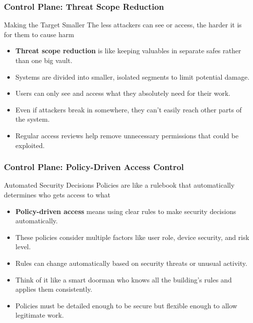 \documentclass{beamer}
\begin{document}
\begin{frame}
    \frametitle{Control Plane: Threat Scope Reduction}
    \begin{block}{Making the Target Smaller}
        The less attackers can see or access, the harder it is for them to cause harm
    \end{block}
    \begin{itemize}
        \item \textbf{Threat scope reduction} is like keeping valuables in separate safes rather than one big vault.
        \item Systems are divided into smaller, isolated segments to limit potential damage.
        \item Users can only see and access what they absolutely need for their work.
        \item Even if attackers break in somewhere, they can't easily reach other parts of the system.
        \item Regular access reviews help remove unnecessary permissions that could be exploited.
    \end{itemize}
\end{frame}



\begin{frame}
    \frametitle{Control Plane: Policy-Driven Access Control}
    \begin{block}{Automated Security Decisions}
        Policies are like a rulebook that automatically determines who gets access to what
    \end{block}
    \begin{itemize}
        \item \textbf{Policy-driven access} means using clear rules to make security decisions automatically.
        \item These policies consider multiple factors like user role, device security, and risk level.
        \item Rules can change automatically based on security threats or unusual activity.
        \item Think of it like a smart doorman who knows all the building's rules and applies them consistently.
        \item Policies must be detailed enough to be secure but flexible enough to allow legitimate work.
    \end{itemize}
\end{frame}
\end{document}
